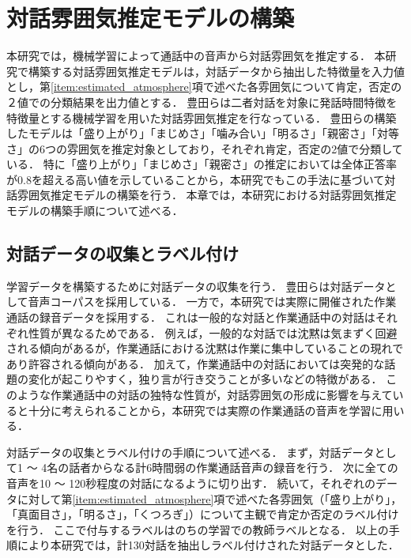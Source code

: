 \chapter{対話雰囲気推定モデルの構築\label{sec:develop_estimation_model}}
\thispagestyle{plain}

本研究では，機械学習によって通話中の音声から対話雰囲気を推定する．
本研究で構築する対話雰囲気推定モデルは，対話データから抽出した特徴量を入力値とし，第\ref{item:estimated_atmosphere}項で述べた各雰囲気について肯定，否定の２値での分類結果を出力値とする．
豊田らは二者対話を対象に発話時間特徴を特徴量とする機械学習を用いた対話雰囲気推定を行なっている\cite{Toyota}．
豊田らの構築したモデルは「盛り上がり」「まじめさ」「噛み合い」「明るさ」「親密さ」「対等さ」の6つの雰囲気を推定対象としており，それぞれ肯定，否定の2値で分類している．
特に「盛り上がり」「まじめさ」「親密さ」の推定においては全体正答率が0.8を超える高い値を示していることから，本研究でもこの手法に基づいて対話雰囲気推定モデルの構築を行う．
本章では，本研究における対話雰囲気推定モデルの構築手順について述べる．

\section{対話データの収集とラベル付け\label{node:deta_collection}}

学習データを構築するために対話データの収集を行う．
豊田らは対話データとして音声コーパス\cite{PASD}を採用している．
一方で，本研究では実際に開催された作業通話の録音データを採用する．
これは一般的な対話と作業通話中の対話はそれぞれ性質が異なるためである．
例えば，一般的な対話では沈黙は気まずく回避される傾向があるが，作業通話における沈黙は作業に集中していることの現れであり許容される傾向がある．
加えて，作業通話中の対話においては突発的な話題の変化が起こりやすく，独り言が行き交うことが多いなどの特徴がある．
このような作業通話中の対話の独特な性質が，対話雰囲気の形成に影響を与えていると十分に考えられることから，本研究では実際の作業通話の音声を学習に用いる．

対話データの収集とラベル付けの手順について述べる．
まず，対話データとして1 〜 4名の話者からなる計6時間弱の作業通話音声の録音を行う．
次に全ての音声を10 〜 120秒程度の対話になるように切り出す．
続いて，それぞれのデータに対して第\ref{item:estimated_atmosphere}項で述べた各雰囲気（「盛り上がり」，「真面目さ」，「明るさ」，「くつろぎ」）について主観で肯定か否定のラベル付けを行う．
ここで付与するラベルはのちの学習での教師ラベルとなる．
以上の手順により本研究では，計130対話を抽出しラベル付けされた対話データとした．

